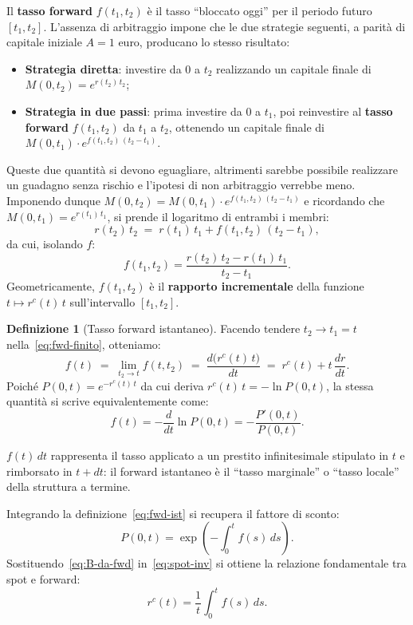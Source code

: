 \documentclass[11pt,a4paper]{article}
\theoremstyle{plain}
\theoremstyle{definition}
\newtheorem{definizione}[teorema]{Definizione}
\theoremstyle{remark}
\begin{document}
Il \textbf{tasso forward} $f(t_1, t_2)$ \`e il tasso ``bloccato oggi'' per il periodo
futuro $[t_1, t_2]$. L'assenza di arbitraggio impone che le due strategie seguenti, a parit\`a
di capitale iniziale $A=1$ euro, producano lo stesso risultato:
\begin{itemize}
  \item \textbf{Strategia diretta}: investire da $0$ a $t_2$ realizzando un capitale finale di $M(0,t_2) = e^{r(t_2)\,t_2}$;
  \item \textbf{Strategia in due passi}: prima investire da $0$ a $t_1$, poi reinvestire al
        \textbf{tasso forward} $f(t_1,t_2)$ da $t_1$ a $t_2$, ottenendo un capitale finale di
        $M(0,t_1)\cdot e^{f(t_1,t_2)\,(t_2-t_1)}$.
\end{itemize}

Queste due quantit\`a si devono eguagliare, altrimenti sarebbe possibile realizzare un guadagno
senza rischio e l'ipotesi di non arbitraggio verrebbe meno. Imponendo dunque
$M(0,t_2) = M(0,t_1)\cdot e^{f(t_1,t_2)\,(t_2-t_1)}$ e ricordando che $M(0,t_1)=e^{r(t_1)\,t_1}$, si prende il logaritmo di entrambi i membri:
\[
  r(t_2)\,t_2 \;=\; r(t_1)\,t_1 + f(t_1,t_2)\,(t_2-t_1),
\]
da cui, isolando $f$:
\begin{equation}
  f(t_1, t_2) = \frac{r(t_2)\,t_2 - r(t_1)\,t_1}{t_2 - t_1}.
  \label{eq:fwd-finito}
\end{equation}
Geometricamente, $f(t_1,t_2)$ \`e il \textbf{rapporto incrementale} della funzione
$t\mapsto r^c(t)\,t$ sull'intervallo $[t_1,t_2]$.

\begin{definizione}[Tasso forward istantaneo]
\label{def:forward}
Facendo tendere $t_2 \to t_1 = t$ nella~\eqref{eq:fwd-finito}, otteniamo:
\begin{equation}
  f(t) \;=\; \lim_{t_2 \to t} f(t, t_2)
       \;=\; \frac{d\bigl(r^c(t)\,t\bigr)}{dt}
       \;=\; r^c(t) + t\,\frac{dr}{dt}.
  \label{eq:fwd-ist}
\end{equation}
Poich\'e $P(0,t)=e^{-r^c(t)\,t}$ da cui deriva $r^c(t)\,t=-\ln P(0,t)$, la stessa quantit\`a si
scrive equivalentemente come:
\[
  f(t) = -\frac{d}{dt}\ln P(0,t) = -\frac{P'(0,t)}{P(0,t)}.
\]
\end{definizione}

$f(t)\,dt$ rappresenta il tasso applicato a un prestito infinitesimale stipulato in $t$
e rimborsato in $t+dt$: il forward istantaneo \`e il ``tasso marginale'' o ``tasso locale''
della struttura a termine.


Integrando la definizione~\eqref{eq:fwd-ist} si recupera il fattore di sconto:
\begin{equation}
  P(0,t) = \exp\!\left(-\int_0^t f(s)\,ds\right).
  \label{eq:B-da-fwd}
\end{equation}
Sostituendo~\eqref{eq:B-da-fwd} in~\eqref{eq:spot-inv} si ottiene la relazione
fondamentale tra spot e forward:
\begin{equation}
  r^c(t) = \frac{1}{t}\int_0^t f(s)\,ds.
  \label{eq:spot-media-fwd}
\end{equation}
\end{document}
